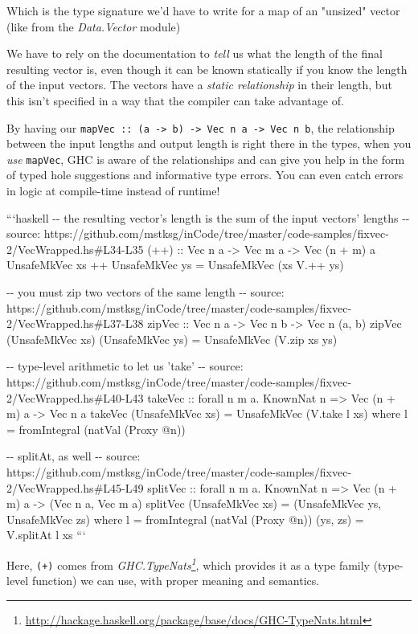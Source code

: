 \documentclass[]{article}
\renewcommand{\href}[2]{#2\footnote{\url{#1}}}
\begin{document}
Which is the type signature we'd have to write for a map of an "unsized" vector
(like from the \emph{Data.Vector} module)

We have to rely on the documentation to \emph{tell} us what the length of the
final resulting vector is, even though it can be known statically if you know
the length of the input vectors. The vectors have a \emph{static relationship}
in their length, but this isn't specified in a way that the compiler can take
advantage of.

By having our
\texttt{mapVec\ ::\ (a\ -\textgreater{}\ b)\ -\textgreater{}\ Vec\ n\ a\ -\textgreater{}\ Vec\ n\ b},
the relationship between the input lengths and output length is right there in
the types, when you \emph{use} \texttt{mapVec}, GHC is aware of the
relationships and can give you help in the form of typed hole suggestions and
informative type errors. You can even catch errors in logic at compile-time
instead of runtime!

```haskell -\/- the resulting vector's length is the sum of the input vectors'
lengths -\/- source:
https://github.com/mstksg/inCode/tree/master/code-samples/fixvec-2/VecWrapped.hs\#L34-L35
(++) :: Vec n a -\textgreater{} Vec m a -\textgreater{} Vec (n + m) a
UnsafeMkVec xs ++ UnsafeMkVec ys = UnsafeMkVec (xs V.++ ys)

-\/- you must zip two vectors of the same length -\/- source:
https://github.com/mstksg/inCode/tree/master/code-samples/fixvec-2/VecWrapped.hs\#L37-L38
zipVec :: Vec n a -\textgreater{} Vec n b -\textgreater{} Vec n (a, b) zipVec
(UnsafeMkVec xs) (UnsafeMkVec ys) = UnsafeMkVec (V.zip xs ys)

-\/- type-level arithmetic to let us 'take' -\/- source:
https://github.com/mstksg/inCode/tree/master/code-samples/fixvec-2/VecWrapped.hs\#L40-L43
takeVec :: forall n m a. KnownNat n =\textgreater{} Vec (n + m) a
-\textgreater{} Vec n a takeVec (UnsafeMkVec xs) = UnsafeMkVec (V.take l xs)
where l = fromIntegral (natVal (Proxy @n))

-\/- splitAt, as well -\/- source:
https://github.com/mstksg/inCode/tree/master/code-samples/fixvec-2/VecWrapped.hs\#L45-L49
splitVec :: forall n m a. KnownNat n =\textgreater{} Vec (n + m) a
-\textgreater{} (Vec n a, Vec m a) splitVec (UnsafeMkVec xs) = (UnsafeMkVec ys,
UnsafeMkVec zs) where l = fromIntegral (natVal (Proxy @n)) (ys, zs) = V.splitAt
l xs ```

Here, \texttt{(+)} comes from
\emph{\href{http://hackage.haskell.org/package/base/docs/GHC-TypeNats.html}{GHC.TypeNats}},
which provides it as a type family (type-level function) we can use, with proper
meaning and semantics.
\end{document}
